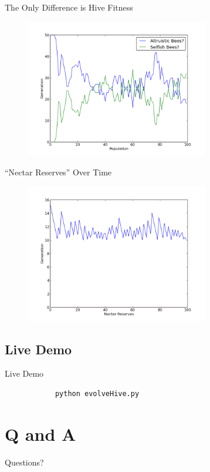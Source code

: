 \documentclass{beamer}
\begin{document}
	\begin{frame}{The Only Difference is Hive Fitness}
		\begin{figure}
			
		\includegraphics[width=8cm]{hive_influenced_bees.png}
		\end{figure}
	
	\end{frame}

	\begin{frame}{``Nectar Reserves'' Over Time}
		\begin{figure}
		\includegraphics[width=8cm]{hive_influenced_bees_nectar.png}
			
		\end{figure}
	\end{frame}

	\subsection{Live Demo}
	\begin{frame}[fragile]{Live Demo}
		\begin{verbatim}
			python evolveHive.py
		\end{verbatim}
	\end{frame}

	\section{Q and A}
	\begin{frame}{Questions?}
		\titlepage
	\end{frame}
\end{document}
